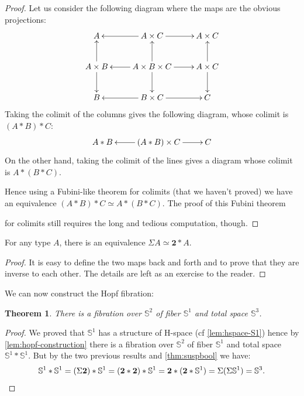 \documentclass[10pt,a4paper]{article}
\providecommand{\index}[1]{}
\newcommand{\eqv}[2]{\ensuremath{#1 \simeq #2}\xspace}
\newcommand{\bool}{\ensuremath{\mathbf{2}}\xspace}
\newcommand{\Sn}{\mathbb{S}}
\newcommand{\susp}{\Sigma}
\newtheorem{thm}{Theorem}[section]
\theoremstyle{definition}
\theoremstyle{remark}
\numberwithin{equation}{section}
\begin{document}
\begin{proof}
  Let us consider the following diagram where the maps are the obvious
  projections:
  \[\xymatrix{
    A & A\times C \ar[l] \ar[r] & A\times C\\
    A\times B \ar[u] \ar[d] & A\times B\times C \ar[l]\ar[u]\ar[r]\ar[d] &
    A\times C \ar[u] \ar[d] \\
    B & B\times C \ar[l] \ar[r] & C}\]
  Taking the colimit of the columns gives the following
  diagram, whose colimit is $(A*B)*C$:
  \[\xymatrix{A*B & (A*B)\times C \ar[l]\ar[r] & C}\]
  On the other hand, taking the colimit of the lines gives a diagram whose
  colimit is $A*(B*C)$.

  Hence using a Fubini-like theorem for colimits (that we haven’t proved) we
  have an equivalence $\eqv{(A*B)*C}{A*(B*C)}$. The proof of this Fubini theorem
  \index{Fubini theorem for colimits}
  for colimits still requires the long and tedious computation, though.
\end{proof}

\begin{lem}
  For any type $A$, there is an equivalence $\eqv{\susp A}{\bool*A}$.
\end{lem}

\begin{proof}
  It is easy to define the two maps back and forth and to prove that they are
  inverse to each other. The details are left as an exercise to the reader.
\end{proof}

We can now construct the Hopf fibration:

\begin{thm}
  There is a fibration over $\Sn^2$ of fiber $\Sn^1$ and total space $\Sn^3$.
  \index{total!space}%
\end{thm}
\begin{proof}
  We proved that $\Sn^1$ has a structure of H-space (cf \cref{lem:hspace-S1})
  hence by \cref{lem:hopf-construction} there is a fibration over $\Sn^2$ of
  fiber $\Sn^1$ and total space $\Sn^1*\Sn^1$. But by the two previous results
  and \cref{thm:suspbool} we have:
  \begin{equation*}
    \Sn^1*\Sn^1 = (\susp\bool)*\Sn^1
    =(\bool*\bool)*\Sn^1
    =\bool*(\bool*\Sn^1)
    =\susp(\susp\Sn^1)
    =\Sn^3. \qedhere
  \end{equation*}
\end{proof}



\end{document}
